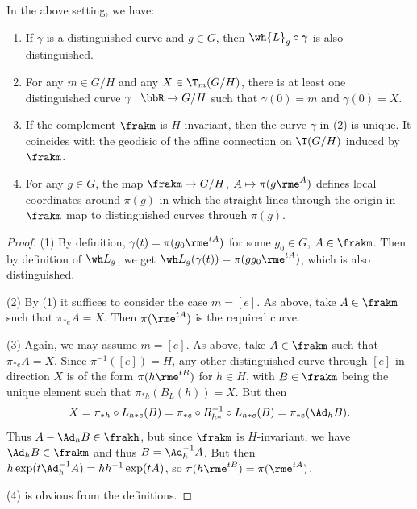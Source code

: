 \begin{prop}\label{prop 1.4.11 Cap}
    In the above setting, we have: 
    \begin{enumerate}[label=(\arabic*)]
        \item If $\gamma$ is a distinguished curve and $g\in G$, then $\wh{L}_g\circ\gamma$ is also distinguished.
        \item For any $m\in G\slash H$ and any $X\in \T_m(G\slash H)$, there is at least one distinguished curve $\gamma:\bbR\to G\slash H$ such that $\gamma(0)=m$ and $\dot\gamma(0)=X$.
        \item If the complement $\frakm$ is $H$-invariant, then the curve $\gamma$ in (2) is unique. It coincides with the geodisic of the affine connection on $\T(G\slash H)$ induced by $\frakm$.
        \item For any $g\in G$, the map $\frakm\to G\slash H$, $A\mapsto \pi(g\rme^A)$ defines local coordinates around $\pi(g)$ in which the straight lines through the origin in $\frakm$ map to distinguished curves through $\pi(g)$.
    \end{enumerate}
\end{prop}
\begin{proof}
    (1) By definition, $\gamma(t)=\pi(g_0\rme^{tA})$ for some $g_0\in G$, $A\in\frakm$. Then by definition of $\wh L_g$, we get $\wh L_g(\gamma(t))=\pi(gg_0\rme^{tA})$, which is also distinguished.

    (2) By (1) it suffices to consider the case $m=[e]$. As above, take $A\in\frakm$ such that $\pi_{\ast e}A=X$. Then $\pi(\rme^{tA})$ is the required curve.

    (3) Again, we may assume $m=[e]$. As above, take $A\in\frakm$ such that $\pi_{\ast e}A=X$. Since $\pi^{-1}([e])=H$, any other distinguished curve through $[e]$ in direction $X$ is of the form $\pi(h\rme^{tB})$ for $h\in H$, with $B\in\frakm$ being the unique element such that $\pi_{\ast h}(B_L(h))=X$. But then 
    \[X=\pi_{\ast h}\circ L_{h\ast e}(B)=\pi_{\ast e}\circ R_{h\ast}^{-1}\circ L_{h\ast e}(B)=\pi_{\ast e}(\Ad_h B).\]
    Thus $A-\Ad_h B\in\frakh$, but since $\frakm$ is $H$-invariant, we have $\Ad_h B\in\frakm$ and thus $B=\Ad_h^{-1}A$. But then $h\exp(t\Ad_{h}^{-1}A)=hh^{-1}\exp(tA)$, so $\pi(h\rme^{tB})=\pi(\rme^{tA})$.

    (4) is obvious from the definitions.
\end{proof}

